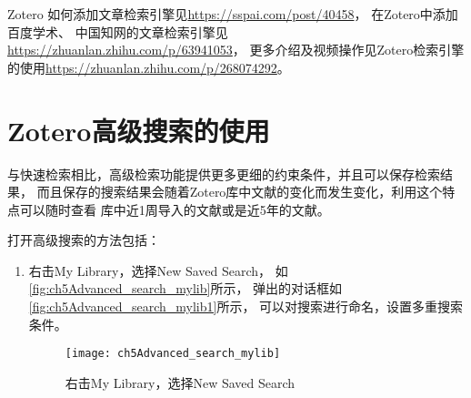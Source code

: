 \documentclass[cn,11pt,chinese]{elegantbook}
\begin{document}
		Zotero 如何添加文章检索引擎见\url{https://sspai.com/post/40458}，
		在Zotero中添加百度学术、
		中国知网的文章检索引擎见\url{https://zhuanlan.zhihu.com/p/63941053}，
		更多介绍及视频操作见Zotero检索引擎的使用\url{https://zhuanlan.zhihu.com/p/268074292}。



		
		\section{Zotero高级搜索的使用}\label{sec:Advanced_search}
		与快速检索相比，高级检索功能提供更多更细的约束条件，并且可以保存检索结果，
		而且保存的搜索结果会随着Zotero库中文献的变化而发生变化，利用这个特点可以随时查看
		库中近1周导入的文献或是近5年的文献。

		打开高级搜索的方法包括：
				\begin{enumerate}
					\item 右击My Library，选择New Saved Search，
					如\autoref{fig:ch5Advanced_search_mylib}所示，
					弹出的对话框如\autoref{fig:ch5Advanced_search_mylib1}所示，
					可以对搜索进行命名，设置多重搜索条件。
						\begin{figure}[ht]
							\centering
							\texttt{[image: ch5Advanced\_search\_mylib]}
							\caption{右击My Library，选择New Saved Search}
							\label{fig:ch5Advanced_search_mylib}
						\end{figure}
						

\end{enumerate}
\end{document}
